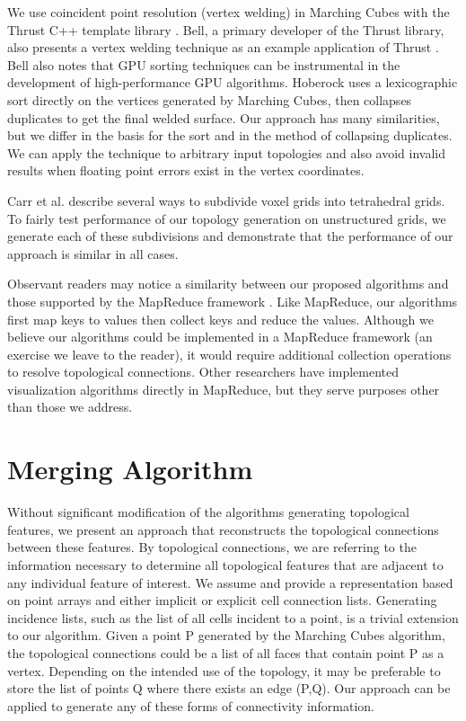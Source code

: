 \documentclass[review,journal]{vgtc}         %
\begin{document}
We use coincident point resolution (vertex welding) in Marching Cubes with the Thrust
C++ template library \cite{Bell2012}. Bell, a primary
developer of the Thrust library, also presents a vertex welding technique as an
example application of Thrust \cite{Bell2010}. Bell also notes that GPU sorting techniques can
be instrumental in the development of high-performance GPU algorithms. Hoberock uses a
lexicographic sort directly on the vertices generated by Marching Cubes, then collapses 
duplicates to get the final welded surface. Our approach has many similarities, but we
differ in the basis for the sort and in the method of collapsing duplicates. We
can apply the technique to arbitrary input topologies and also avoid invalid results when
floating point errors exist in the vertex coordinates.

Carr et al. \cite{Carr2006} describe several ways to subdivide voxel grids into tetrahedral grids. To fairly test performance of our topology generation on unstructured grids, we generate each of these subdivisions and demonstrate that the performance of our approach is similar in all cases.

Observant readers may notice a similarity between our proposed algorithms and those supported by the MapReduce framework \cite{MapReduce}. Like MapReduce, our algorithms first map keys to values then collect keys and reduce the values. Although we believe our algorithms could be implemented in a MapReduce framework (an exercise we leave to the reader), it would require additional collection operations to resolve topological connections. Other researchers 
\cite{Stuart2010}\cite{Vo2011} have implemented visualization algorithms directly in MapReduce, but they serve purposes other than those we address.

\section{Merging Algorithm}
Without significant modification of the algorithms generating topological features,
we present an approach that reconstructs the topological connections
between these features. By topological connections, we are referring to the information necessary to
determine all topological features that are adjacent to any individual feature of 
interest. We assume and provide a representation based on point arrays and either implicit or explicit cell connection lists. Generating incidence lists, such as the list of all cells incident to a point, is a trivial extension to our algorithm. Given a point P 
generated by the Marching Cubes algorithm, the topological connections
could be a list of all faces that contain point P as a vertex. Depending on
the intended use of the topology, it may be preferable to store the list of
points Q where there exists an edge (P,Q). Our approach can be applied
to generate any of these forms of connectivity information.
\end{document}

